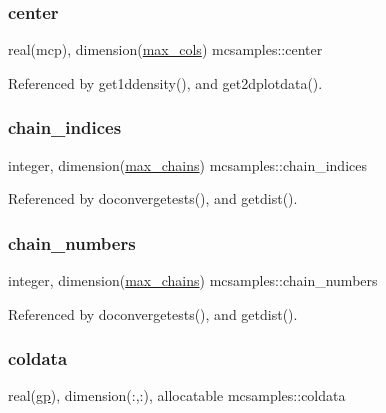 \subsubsection{\texorpdfstring{center}{center}}
{\footnotesize\ttfamily real(mcp), dimension(\mbox{\hyperlink{namespacemcsamples_ae8386bad918d8af8d203683c01d5818c}{max\+\_\+cols}}) mcsamples\+::center}



Referenced by get1ddensity(), and get2dplotdata().

\mbox{\label{namespacemcsamples_a196c1e189b163a496c0da2fcc96bf1f4}} 
\subsubsection{\texorpdfstring{chain\+\_\+indices}{chain\_indices}}
{\footnotesize\ttfamily integer, dimension(\mbox{\hyperlink{namespacemcsamples_a204c829ca43df2c6d41335156e6786ee}{max\+\_\+chains}}) mcsamples\+::chain\+\_\+indices}



Referenced by doconvergetests(), and getdist().

\mbox{\label{namespacemcsamples_a619b6da70c38ede6a9851a3ee89b4019}} 
\subsubsection{\texorpdfstring{chain\+\_\+numbers}{chain\_numbers}}
{\footnotesize\ttfamily integer, dimension(\mbox{\hyperlink{namespacemcsamples_a204c829ca43df2c6d41335156e6786ee}{max\+\_\+chains}}) mcsamples\+::chain\+\_\+numbers}



Referenced by doconvergetests(), and getdist().

\mbox{\label{namespacemcsamples_a1f7790a8989ae24a32dcef594163cfd6}} 
\subsubsection{\texorpdfstring{coldata}{coldata}}
{\footnotesize\ttfamily real(\mbox{\hyperlink{namespacemcsamples_a423ddd0f2de0560617b74a17231275e0}{gp}}), dimension(\+:,\+:), allocatable mcsamples\+::coldata}



